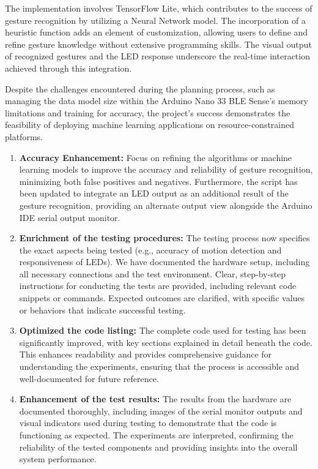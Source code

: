 The implementation involves TensorFlow Lite, which contributes to the success of gesture recognition by utilizing a Neural Network model. The incorporation of a heuristic function adds an element of customization, allowing users to define and refine gesture knowledge without extensive programming skills. The visual output of recognized gestures and the LED response underscore the real-time interaction achieved through this integration.

Despite the challenges encountered during the planning process, such as managing the data model size within the Arduino Nano 33 BLE Sense's memory limitations and training for accuracy, the project's success demonstrates the feasibility of deploying machine learning applications on resource-constrained platforms.

\begin{enumerate}
\item \textbf{Accuracy Enhancement:} 
Focus on refining the algorithms or machine learning models to improve the accuracy and reliability of gesture recognition, minimizing both false positives and negatives. Furthermore, the script has been updated to integrate an LED output as an additional result of the gesture recognition, providing an alternate output view alongside the Arduino IDE serial output monitor.

\item \textbf{Enrichment of the testing procedures:} 
The testing process now specifies the exact aspects being tested (e.g., accuracy of motion detection and responsiveness of LEDs). We have documented the hardware setup, including all necessary connections and the test environment. Clear, step-by-step instructions for conducting the tests are provided, including relevant code snippets or commands. Expected outcomes are clarified, with specific values or behaviors that indicate successful testing.

\item \textbf{Optimized the code listing:} 
The complete code used for testing has been significantly improved, with key sections explained in detail beneath the code. This enhances readability and provides comprehensive guidance for understanding the experiments, ensuring that the process is accessible and well-documented for future reference.

\item \textbf{Enhancement of the test results:} 
The results from the hardware are documented thoroughly, including images of the serial monitor outputs and visual indicators used during testing to demonstrate that the code is functioning as expected. The experiments are interpreted, confirming the reliability of the tested components and providing insights into the overall system performance.


\end{enumerate}
